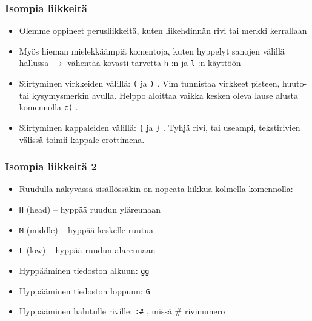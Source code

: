 \documentclass[]{beamer}
\newcommand{\Tohj}[1]{\texttt{#1}}
\newcommand{\com}[1]{{\color{blue!50!black}\Tohj{#1}} \!\!}
\begin{document}
\begin{frame}
    \frametitle {Isompia liikkeitä}
    \begin{itemize}
        \item Olemme oppineet perusliikkeitä, kuten liikehdinnän rivi tai merkki kerrallaan 
        \item Myös hieman mielekkäämpiä komentoja, kuten hyppelyt sanojen välillä hallussa $\to$ vähentää kovasti tarvetta \com{h}:n ja \com{l}:n käyttöön
        \pause 
        \item Siirtyminen virkkeiden välillä: \com{(} ja \com{)}. Vim tunnistaa virkkeet pisteen, huuto- tai kysymysmerkin avulla. Helppo aloittaa vaikka kesken oleva lause alusta komennolla \com{c(}.
        \item Siirtyminen kappaleiden välillä: \com{\{} ja \com{\}}. Tyhjä rivi, tai useampi, tekstirivien välissä toimii kappale-erottimena.
    \end{itemize}
\end{frame}

\begin{frame}
    \frametitle {Isompia liikkeitä 2}
    \begin{itemize}
        \item Ruudulla näkyvässä sisällössäkin on nopeata liikkua kolmella komennolla:
        \item \com{H} (head) -- hyppää ruudun yläreunaan
        \item \com{M} (middle) -- hyppää keskelle ruutua
        \item \com{L} (low) -- hyppää ruudun alareunaan
        \pause
        \item Hyppääminen tiedoston alkuun: \com{gg}
        \item Hyppääminen tiedoston loppuun: \com{G}
        \item Hyppääminen halutulle riville: \com{:\#}, missä \# rivinumero
    \end{itemize}
\end{frame}
\end{document}
